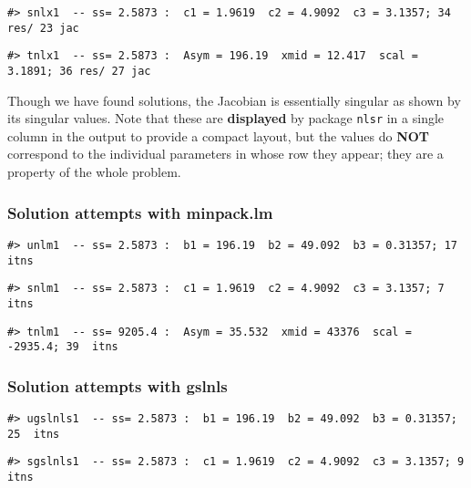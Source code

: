 \begin{verbatim}
#> snlx1  -- ss= 2.5873 :  c1 = 1.9619  c2 = 4.9092  c3 = 3.1357; 34 res/ 23 jac
\end{verbatim}

\begin{verbatim}
#> tnlx1  -- ss= 2.5873 :  Asym = 196.19  xmid = 12.417  scal = 3.1891; 36 res/ 27 jac
\end{verbatim}

Though we have found solutions, the Jacobian is essentially singular as
shown by its singular
values. Note that these are \textbf{displayed} by package \texttt{nlsr} in a single column in
the output to provide a compact layout, but the values do \textbf{NOT} correspond to
the individual parameters in
whose row they appear; they are a property of the whole problem.

\hypertarget{solution-attempts-with-minpack.lm}{%
\subsubsection{Solution attempts with minpack.lm}\label{solution-attempts-with-minpack.lm}}

\begin{verbatim}
#> unlm1  -- ss= 2.5873 :  b1 = 196.19  b2 = 49.092  b3 = 0.31357; 17  itns
\end{verbatim}

\begin{verbatim}
#> snlm1  -- ss= 2.5873 :  c1 = 1.9619  c2 = 4.9092  c3 = 3.1357; 7  itns
\end{verbatim}

\begin{verbatim}
#> tnlm1  -- ss= 9205.4 :  Asym = 35.532  xmid = 43376  scal = -2935.4; 39  itns
\end{verbatim}

\hypertarget{solution-attempts-with-gslnls}{%
\subsubsection{Solution attempts with gslnls}\label{solution-attempts-with-gslnls}}

\begin{verbatim}
#> ugslnls1  -- ss= 2.5873 :  b1 = 196.19  b2 = 49.092  b3 = 0.31357; 25  itns
\end{verbatim}

\begin{verbatim}
#> sgslnls1  -- ss= 2.5873 :  c1 = 1.9619  c2 = 4.9092  c3 = 3.1357; 9  itns
\end{verbatim}

